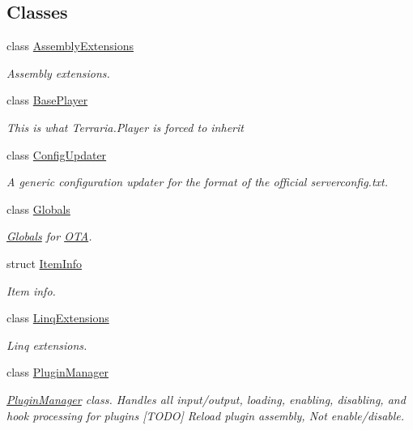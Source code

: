 \subsection*{Classes}
\begin{DoxyCompactItemize}
\item 
class \hyperlink{classOTA_1_1AssemblyExtensions}{Assembly\+Extensions}
\begin{DoxyCompactList}\small\item\em Assembly extensions. \end{DoxyCompactList}\item 
class \hyperlink{classOTA_1_1BasePlayer}{Base\+Player}
\begin{DoxyCompactList}\small\item\em This is what Terraria.\+Player is forced to inherit \end{DoxyCompactList}\item 
class \hyperlink{classOTA_1_1ConfigUpdater}{Config\+Updater}
\begin{DoxyCompactList}\small\item\em A generic configuration updater for the format of the official serverconfig.\+txt. \end{DoxyCompactList}\item 
class \hyperlink{classOTA_1_1Globals}{Globals}
\begin{DoxyCompactList}\small\item\em \hyperlink{classOTA_1_1Globals}{Globals} for \hyperlink{namespaceOTA}{O\+T\+A}. \end{DoxyCompactList}\item 
struct \hyperlink{structOTA_1_1ItemInfo}{Item\+Info}
\begin{DoxyCompactList}\small\item\em Item info. \end{DoxyCompactList}\item 
class \hyperlink{classOTA_1_1LinqExtensions}{Linq\+Extensions}
\begin{DoxyCompactList}\small\item\em Linq extensions. \end{DoxyCompactList}\item 
class \hyperlink{classOTA_1_1PluginManager}{Plugin\+Manager}
\begin{DoxyCompactList}\small\item\em \hyperlink{classOTA_1_1PluginManager}{Plugin\+Manager} class. Handles all input/output, loading, enabling, disabling, and hook processing for plugins \mbox{[}T\+O\+D\+O\mbox{]} Reload plugin assembly, Not enable/disable. \end{DoxyCompactList}\item 

\end{DoxyCompactItemize}
